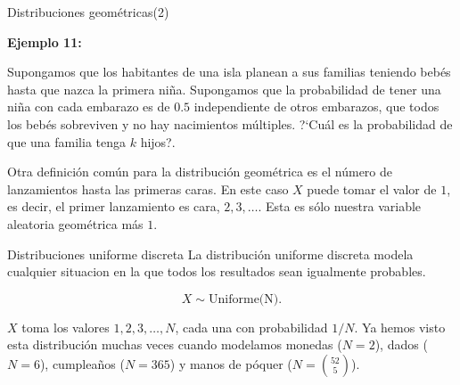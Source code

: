 \documentclass[10pt]{beamer}
\begin{document}
\begin{frame}{Distribuciones geom\'etricas(2)}
	\small{
\textbf{Ejemplo 11:}

Supongamos que los habitantes de una isla planean a sus familias teniendo beb\'es hasta que nazca la primera ni\~na. Supongamos que la probabilidad de tener una ni\~na con cada embarazo es de $0.5$ independiente de otros embarazos, que todos los beb\'es sobreviven y no hay nacimientos m\'ultiples. ?`Cu\'al es la probabilidad de que una familia tenga $k$ hijos?.}

\vspace{0.8cm}

\scriptsize{Otra definici\'on com\'un para la distribuci\'on geom\'etrica es el n\'umero de lanzamientos hasta las primeras caras. En este caso $X$ puede tomar el valor de $1$, es decir, el primer lanzamiento es cara, $2, 3,\dots$.  Esta es s\'olo nuestra variable aleatoria geom\'etrica m\'as $1$. 
	
}
	
\end{frame}

\begin{frame}{Distribuciones  uniforme discreta}
La distribuci\'on uniforme discreta modela cualquier situacion en la que todos los resultados sean igualmente probables.

\[
X \sim \text{Uniforme(N)}.
\]

\vspace{0.2cm}

$X$ toma los valores $1, 2, 3,\dots, N$, cada una con probabilidad $1/ N$. Ya hemos visto esta distribuci\'on muchas veces cuando modelamos monedas  ($N = 2$), dados ($N = 6$), cumplea\~nos ($N = 365$) y manos de p\'oquer ($N = \binom{52}{5}$).
\end{frame}
\end{document}
